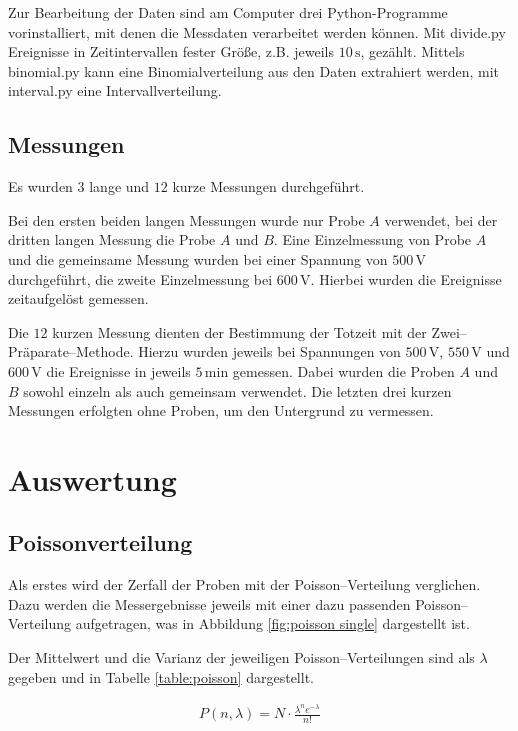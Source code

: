 \documentclass[12pt,a4paper]{scrartcl}
\numberwithin{equation}{section} %
\newcommand{\code}[1]{\textsf{#1}}
\renewcommand{\[}{} %
\renewcommand{\]}{\noindent} %
\begin{document}
Zur Bearbeitung der Daten sind am Computer drei Python-Programme vorinstalliert, mit denen die Messdaten verarbeitet werden können. Mit \code{divide.py} Ereignisse in Zeitintervallen fester Größe, z.B.  jeweils $10\mathrm{\,s}$, gezählt. Mittels \code{binomial.py} kann eine Binomialverteilung aus den Daten extrahiert werden, mit \code{interval.py} eine Intervallverteilung.

\subsection{Messungen}
Es wurden $3$ lange und $12$ kurze Messungen durchgeführt.

Bei den ersten beiden langen Messungen wurde nur Probe $A$ verwendet, bei der dritten langen Messung die Probe $A$ und $B$. Eine Einzelmessung von Probe $A$ und die gemeinsame Messung wurden bei einer Spannung von $500\mathrm{\,V}$ durchgeführt, die zweite Einzelmessung bei $600\mathrm{\,V}$. Hierbei wurden die Ereignisse zeitaufgelöst gemessen.

Die $12$ kurzen Messung dienten der Bestimmung der Totzeit mit der Zwei--Präparate--Methode. Hierzu wurden jeweils bei Spannungen von $500\mathrm{\,V}$, $550\mathrm{\,V}$ und $600\mathrm{\,V}$ die Ereignisse in jeweils $5\mathrm{\,min}$ gemessen. Dabei wurden die Proben $A$ und $B$ sowohl einzeln als auch gemeinsam verwendet. Die letzten drei kurzen Messungen erfolgten ohne Proben, um den Untergrund zu vermessen.

\clearpage
\hypertarget{auswertung}{%
\section{Auswertung}\label{auswertung}}

\hypertarget{poissonverteilung}{%
\subsection{Poissonverteilung}\label{poissonverteilung}}
Als erstes wird der Zerfall der Proben mit der Poisson--Verteilung verglichen. Dazu werden die Messergebnisse jeweils mit einer dazu passenden Poisson--Verteilung aufgetragen, was in Abbildung \ref{fig:poisson single} dargestellt ist.

Der Mittelwert und die Varianz der jeweiligen Poisson--Verteilungen sind als $\lambda$ gegeben und in Tabelle \ref{table:poisson} dargestellt.

\begin{eqnarray}
	P(n,\lambda) = N \cdot \frac{\lambda^n e^{-\lambda}}{n!}
\end{eqnarray}
\end{document}
